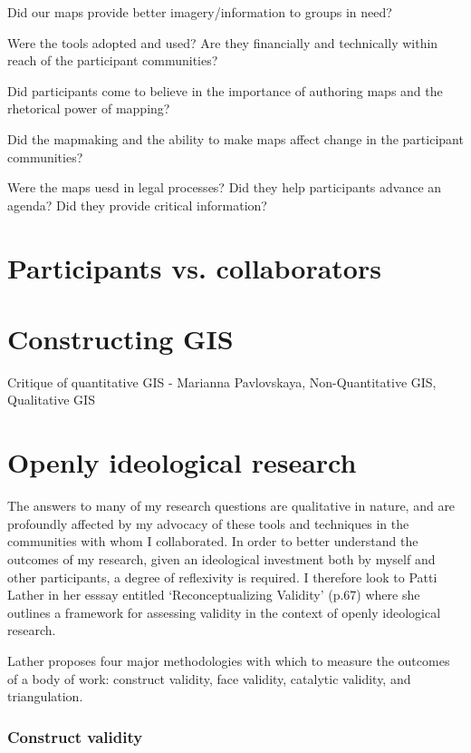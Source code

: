 \documentclass[11pt]{report}
\begin{document}
Did our maps provide better imagery/information to groups in need?

Were the tools adopted and used? Are they financially and technically within reach of the participant communities? 

Did participants come to believe in the importance of authoring maps and the rhetorical power of mapping?

Did the mapmaking and the ability to make maps affect change in the participant communities?

Were the maps uesd in legal processes? Did they help participants advance an agenda? Did they provide critical information?

\section{Participants vs. collaborators}


\section{Constructing GIS}

Critique of quantitative GIS - Marianna Pavlovskaya, Non-Quantitative GIS, Qualitative GIS

\section{Openly ideological research}

The answers to many of my research questions are qualitative in nature, and are profoundly affected by my advocacy of these tools and techniques in the communities with whom I collaborated. In order to better understand the outcomes of my research, given an ideological investment both by myself and other participants, a degree of reflexivity is required. I therefore look to Patti Lather in her esssay entitled `Reconceptualizing Validity' (p.67) where she outlines a framework for assessing validity in the context of openly ideological research.  

Lather proposes four major methodologies with which to measure the outcomes of a body of work: construct validity, face validity, catalytic validity, and triangulation.

\subsubsection{Construct validity}
\end{document}
